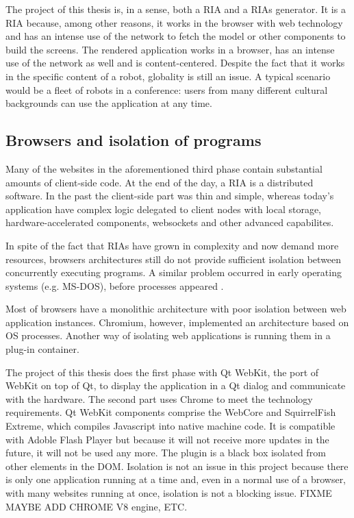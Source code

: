 The project of this thesis is, in a sense, both a \ac{RIA} and a \acp{RIA} generator. 
It is a \ac{RIA} because, among other reasons, it works in the browser with web technology and has an intense use of the network to fetch the model or other components to build the screens.
The rendered application works in a browser, has an intense use of the network as well and is content-centered.
Despite the fact that it works in the specific content of a robot, globality is still an issue.
A typical scenario would be a fleet of robots in a conference: users from many different cultural backgrounds can use the application at any time.


\subsection{Browsers and isolation of programs}    
Many of the websites in the aforementioned third phase contain substantial amounts of client-side code. 
At the end of the day, a \ac{RIA} is a distributed software. 
In the past the client-side part was thin and simple, whereas today's application have complex logic delegated to client nodes with local storage, hardware-accelerated components, websockets and other advanced capabilites.

In spite of the fact that \acp{RIA} have grown in complexity and now demand more resources, browsers architectures still do not provide sufficient isolation between concurrently executing programs.
A similar problem occurred in early operating systems (e.g. MS-DOS), before processes appeared \cite{Reis:2009}. 

Most of browsers have a monolithic architecture with poor isolation between web application instances. Chromium, however, implemented an architecture based on \ac{OS} processes. 
Another way of isolating web applications is running them in a plug-in container. 

The project of this thesis does the first phase with Qt WebKit, the port of WebKit on top of Qt, to display the application in a Qt dialog and communicate with the hardware. 
The second part uses Chrome to meet the technology requirements.
Qt WebKit components comprise the WebCore and SquirrelFish Extreme, which compiles Javascript into native machine code. 
It is compatible with Adoble Flash Player but because it will not receive more updates in the future, it will not be used any more.
The \flash plugin is a black box isolated from other elements in the \ac{DOM}.
Isolation is not an issue in this project because there is only one application running at a time and, even in a normal use of a browser, with many websites running at once, isolation is not a blocking issue.
FIXME MAYBE ADD CHROME V8 engine, ETC.

